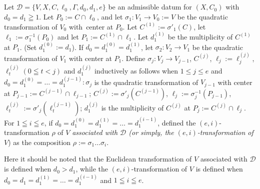 \subsection{}\label{chap2:1.6}
\begin{defi*}
  Let $\mathscr{D}=\{V,X,C,\ell_{0},\Gamma,d_{0},d_{1},e\}$ be an
  admissible datum for $(X,C_{0})$ with $d_{0}=d_{1}\geqq 1$. Let
  $P_{0}:=C\cap \ell_{0}$, and let $\sigma_{1}:V_{1}\to V_{0}:=V$ be the
  quadratic transformation of $V_{0}$ with\pageoriginale\ center at
  $P_{0}$. Let $C^{(1)}:=\sigma'_{1}(C)$, let
  $\ell_{1}:=\sigma^{-1}_{1}(P_{0})$ and let $P_{1}:=C^{(1)}\cap
  \ell_{1}$. Let $d^{(1)}_{1}$ be the multiplicity of $C^{(1)}$ at
  $P_{1}$. (Set $d^{(0)}_{1}:=d_{1}$). If
  $d_{0}=d^{(0)}_{1}=d^{(1)}_{1}$, let $\sigma_{2}:V_{2}\to V_{1}$ be
  the quadratic transformation of $V_{1}$ with center at $P_{1}$. Define
  $\sigma_{j}:V_{j}\to V_{j-1}$, $C^{(j)}$, $\ell_{j}:=\ell^{(j)}_{j}$,
  $\ell^{(j)}_{t}(0\leqq t<j)$ and $d^{(j)}_{1}$ inductively as follows
  when $1\leq j\leq e$ and
  $d_{0}=d^{(0)}_{1}=\ldots=d_{1}^{(j-1)}:\sigma_{j}$ is the quadratic
  transformation of $V_{j-1}$ with center at $P_{j-1}:=C^{(j-1)}\cap
  \ell_{j-1}$; $C^{(j)}:=\sigma'_{j}(C^{(j-1)})$,
  $\ell_{j}:=\sigma^{-1}_{j}(P_{j-1})$,
  $\ell^{(j)}_{t}:=\sigma'_{j}(\ell_{t}^{(j-1)})$; $d^{(j)}_{1}$ is the
  multiplicity of $C^{(j)}$ at $P_{j}:=C^{(j)}\cap \ell_{j}$. For
  $1\leqq i\leqq e$, if
  $d_{0}=d^{(0)}_{1}=d_{1}^{(1)}=\ldots=d_{1}^{(i-1)}$, defined the
  $(e,i)$-transformation $\rho$ of $V$ {\em associated with $\mathscr{D}$ (or
    simply, the $(e,i)$-transformation of $V$}) as the composition
  $\rho:=\sigma_{1}\ldots\sigma_{i}$. 
\end{defi*}

Here it should be noted that the Euclidean transformation of $V$
associated with $\mathscr{D}$ is defined when $d_{0}>d_{1}$, while the
$(e,i)$-transformation of $V$ is defined when
$d_{0}=d_{1}=d_{1}^{(1)}=\ldots=d_{1}^{(i-1)}$ and $1\leqq i\leqq e$.

